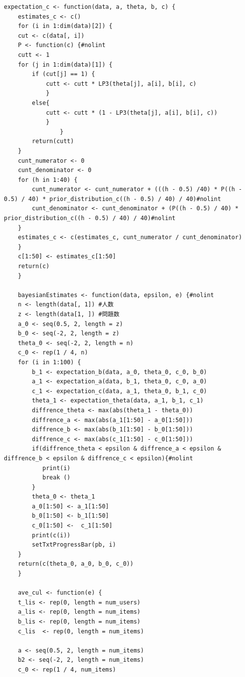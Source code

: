 \documentclass[12pt]{jarticle}
\numberwithin{equation}{subsection}
\begin{document}
\begin{lstlisting}[caption=ベイズ推定法,label=fuge]
    expectation_c <- function(data, a, theta, b, c) {
    estimates_c <- c()
    for (i in 1:dim(data)[2]) {
    cut <- c(data[, i])
    P <- function(c) {#nolint
    cutt <- 1
    for (j in 1:dim(data)[1]) {
        if (cut[j] == 1) {
            cutt <- cutt * LP3(theta[j], a[i], b[i], c)
            }
        else{
            cutt <- cutt * (1 - LP3(theta[j], a[i], b[i], c))
            }
                }
        return(cutt)
    }
    cunt_numerator <- 0
    cunt_denominator <- 0
    for (h in 1:40) {
        cunt_numerator <- cunt_numerator + (((h - 0.5) /40) * P((h - 0.5) / 40) * prior_distribution_c((h - 0.5) / 40) / 40)#nolint
        cunt_denominator <- cunt_denominator + (P((h - 0.5) / 40) * prior_distribution_c((h - 0.5) / 40) / 40)#nolint
    }
    estimates_c <- c(estimates_c, cunt_numerator / cunt_denominator)
    }
    c[1:50] <- estimates_c[1:50]
    return(c)
    }

    bayesianEstimates <- function(data, epsilon, e) {#nolint
    n <- length(data[, 1]) #人数
    z <- length(data[1, ]) #問題数
    a_0 <- seq(0.5, 2, length = z)
    b_0 <- seq(-2, 2, length = z)
    theta_0 <- seq(-2, 2, length = n)
    c_0 <- rep(1 / 4, n)
    for (i in 1:100) {
        b_1 <- expectation_b(data, a_0, theta_0, c_0, b_0)
        a_1 <- expectation_a(data, b_1, theta_0, c_0, a_0)
        c_1 <- expectation_c(data, a_1, theta_0, b_1, c_0)
        theta_1 <- expectation_theta(data, a_1, b_1, c_1)
        diffrence_theta <- max(abs(theta_1 - theta_0))
        diffrence_a <- max(abs(a_1[1:50] - a_0[1:50]))
        diffrence_b <- max(abs(b_1[1:50] - b_0[1:50]))
        diffrence_c <- max(abs(c_1[1:50] - c_0[1:50]))
        if(diffrence_theta < epsilon & diffrence_a < epsilon & diffrence_b < epsilon & diffrence_c < epsilon){#nolint
           print(i)
           break ()
        }
        theta_0 <- theta_1
        a_0[1:50] <- a_1[1:50]
        b_0[1:50] <- b_1[1:50]
        c_0[1:50] <-  c_1[1:50]
        print(c(i))
        setTxtProgressBar(pb, i)
    }
    return(c(theta_0, a_0, b_0, c_0))
    }

    ave_cul <- function(e) {
    t_lis <- rep(0, length = num_users)
    a_lis <- rep(0, length = num_items)
    b_lis <- rep(0, length = num_items)
    c_lis  <- rep(0, length = num_items)

    a <- seq(0.5, 2, length = num_items)
    b2 <- seq(-2, 2, length = num_items)
    c_0 <- rep(1 / 4, num_items)


\end{lstlisting}
\end{document}
